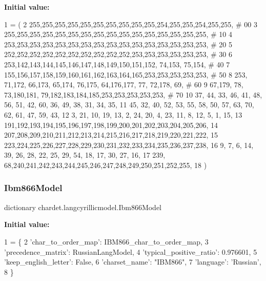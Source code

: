 {\bfseries Initial value\+:}
\begin{DoxyCode}
1 =  (
2 255,255,255,255,255,255,255,255,255,255,254,255,255,254,255,255,  \textcolor{comment}{# 00}
3 255,255,255,255,255,255,255,255,255,255,255,255,255,255,255,255,  \textcolor{comment}{# 10}
4 253,253,253,253,253,253,253,253,253,253,253,253,253,253,253,253,  \textcolor{comment}{# 20}
5 252,252,252,252,252,252,252,252,252,252,253,253,253,253,253,253,  \textcolor{comment}{# 30}
6 253,142,143,144,145,146,147,148,149,150,151,152, 74,153, 75,154,  \textcolor{comment}{# 40}
7 155,156,157,158,159,160,161,162,163,164,165,253,253,253,253,253,  \textcolor{comment}{# 50}
8 253, 71,172, 66,173, 65,174, 76,175, 64,176,177, 77, 72,178, 69,  \textcolor{comment}{# 60}
9  67,179, 78, 73,180,181, 79,182,183,184,185,253,253,253,253,253,  \textcolor{comment}{# 70}
10  37, 44, 33, 46, 41, 48, 56, 51, 42, 60, 36, 49, 38, 31, 34, 35,
11  45, 32, 40, 52, 53, 55, 58, 50, 57, 63, 70, 62, 61, 47, 59, 43,
12   3, 21, 10, 19, 13,  2, 24, 20,  4, 23, 11,  8, 12,  5,  1, 15,
13 191,192,193,194,195,196,197,198,199,200,201,202,203,204,205,206,
14 207,208,209,210,211,212,213,214,215,216,217,218,219,220,221,222,
15 223,224,225,226,227,228,229,230,231,232,233,234,235,236,237,238,
16   9,  7,  6, 14, 39, 26, 28, 22, 25, 29, 54, 18, 17, 30, 27, 16,
17 239, 68,240,241,242,243,244,245,246,247,248,249,250,251,252,255,
18 )
\end{DoxyCode}
\mbox{\label{namespacechardet_1_1langcyrillicmodel_ae6178fd2e56f6b18c6a77ac554a73842}} 
\subsubsection{\texorpdfstring{Ibm866\+Model}{Ibm866Model}}
{\footnotesize\ttfamily dictionary chardet.\+langcyrillicmodel.\+Ibm866\+Model}

{\bfseries Initial value\+:}
\begin{DoxyCode}
1 =  \{
2   \textcolor{stringliteral}{'char\_to\_order\_map'}: IBM866\_char\_to\_order\_map,
3   \textcolor{stringliteral}{'precedence\_matrix'}: RussianLangModel,
4   \textcolor{stringliteral}{'typical\_positive\_ratio'}: 0.976601,
5   \textcolor{stringliteral}{'keep\_english\_letter'}: \textcolor{keyword}{False},
6   \textcolor{stringliteral}{'charset\_name'}: \textcolor{stringliteral}{"IBM866"},
7   \textcolor{stringliteral}{'language'}: \textcolor{stringliteral}{'Russian'},
8 \}
\end{DoxyCode}
\mbox{\label{namespacechardet_1_1langcyrillicmodel_aa36c157da5b2c3c2dcb068a709cbb036}} 
